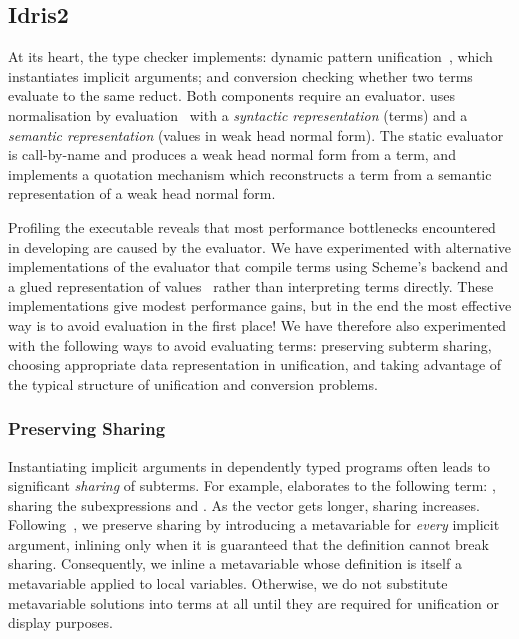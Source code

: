 \subsection{Idris2}
At its heart, the type checker implements: dynamic
pattern
unification~\cite{miller:unification,reed:unification,gundry:thesis},
which instantiates implicit arguments; and conversion checking
whether two terms evaluate to the same reduct.
Both components require an evaluator.  \idris{} uses
normalisation by evaluation~\cite{berger:nbe} with a \emph{syntactic representation}
(terms) and a
\emph{semantic representation} (values in weak head normal form). The
static evaluator is call-by-name and produces a weak head normal form from a term, and
\idris{} implements a quotation mechanism which reconstructs a term from a semantic
representation of a weak head normal form.

Profiling the \idris{} executable reveals that most performance
bottlenecks encountered in developing \Frexlib{} are caused by
the evaluator.
%
We have experimented with alternative implementations of the evaluator
that compile terms using Scheme's backend and a glued
representation of values~\cite{DBLP:journals/mscs/CoquandD97,Chapman2005epigram} rather
than interpreting terms directly.
%
These implementations give
modest performance
gains, but in the end the most effective way is to avoid evaluation in the first place! We have therefore also experimented with the following ways
to avoid evaluating terms: preserving subterm sharing, choosing appropriate
data representation in unification, and taking advantage of the typical
structure of unification and conversion problems.

\subsubsection*{Preserving Sharing}

Instantiating implicit arguments in dependently typed programs often
leads to significant \emph{sharing} of subterms.
For example,
\IdrisData{[}\IdrisData{,} \IdrisData{]}
\IdrisKeyword{:}   
elaborates to the following term:
\IdrisKeyword{(}\IdrisData{::}\IdrisKeyword{)} \IdrisKeyword{(} \IdrisKeyword{)}   \IdrisKeyword{(}\IdrisKeyword{(}\IdrisData{::}\IdrisKeyword{)}    \IdrisKeyword{(} \IdrisKeyword{)}\IdrisKeyword{)},
sharing the subexpressions  and . As the vector
gets longer, sharing increases.
Following~\citet{kovacs:smalltt}, we preserve sharing by introducing a
metavariable for \emph{every} implicit argument, inlining only when it is
guaranteed that the definition cannot break sharing. Consequently,
we inline a metavariable whose definition is itself a metavariable applied
to local variables. Otherwise, we do not substitute metavariable solutions
into terms at all until they are required for unification or display
purposes.

